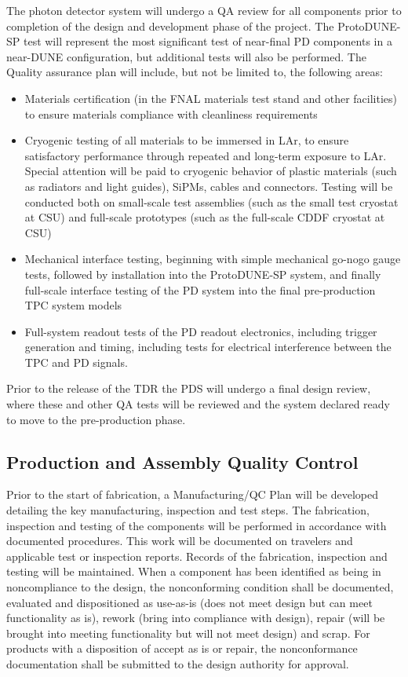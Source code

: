 The photon detector system will undergo a QA review for all components prior to completion of the design and development phase of the project.  The ProtoDUNE-SP test will represent the most significant test of near-final PD components in a near-DUNE configuration, but additional tests will also be performed.  The Quality assurance plan will include, but not be limited to, the following areas:

\begin{itemize}
\item Materials certification (in the FNAL materials test stand and other facilities) to ensure materials compliance with cleanliness requirements
\item Cryogenic testing of all materials to be immersed in LAr, to ensure satisfactory performance through repeated and long-term exposure to LAr.  Special attention will be paid to cryogenic behavior of plastic materials (such as radiators and light guides), SiPMs, cables and connectors.  Testing will be conducted both on small-scale test assemblies (such as the small test cryostat at CSU) and full-scale prototypes (such as the full-scale CDDF cryostat at CSU) 
\item Mechanical interface testing, beginning with simple mechanical go-nogo gauge tests, followed by installation into the ProtoDUNE-SP system, and finally full-scale interface testing of the PD system into the final pre-production TPC system models
\item Full-system readout tests of the PD readout electronics, including trigger generation and timing, including tests for electrical interference between the TPC and PD signals.
\end{itemize}

Prior to the release of the TDR the PDS will undergo a final design review, where these and other QA tests will be reviewed and the system declared ready to move to the pre-production phase.


\subsection{Production and Assembly Quality Control}
\label{sec:fdsp-pd-prodqc}

Prior to the start of fabrication, a Manufacturing/QC Plan will be developed detailing the key manufacturing, inspection and test steps.  The fabrication, inspection and testing of the components will be performed in accordance with documented procedures. This work will be documented on travelers and applicable test or inspection reports. Records of the fabrication, inspection and testing will be maintained. When a component has been identified as being in noncompliance to the design, the nonconforming condition shall be documented, evaluated and dispositioned as use-as-is (does not meet design but can meet functionality as is), rework (bring into compliance with design), repair (will be brought into meeting functionality but will not meet design) and scrap. For products with a disposition of accept as is or repair, the nonconformance documentation shall be submitted to the design authority for approval.   

